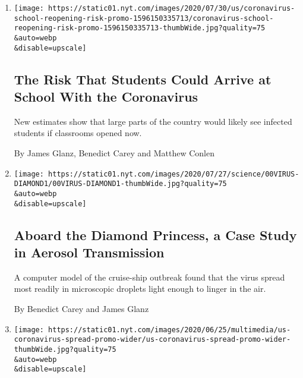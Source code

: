 \begin{enumerate}
\def\labelenumi{\arabic{enumi}.}
\item
  \href{/interactive/2020/07/31/us/coronavirus-school-reopening-risk.html}{}

  \texttt{[image: https://static01.nyt.com/images/2020/07/30/us/coronavirus-school-reopening-risk-promo-1596150335713/coronavirus-school-reopening-risk-promo-1596150335713-thumbWide.jpg?quality=75\\\&auto=webp\\\&disable=upscale]}

  \hypertarget{the-risk-that-students-could-arrive-at-school-with-the-coronavirus}{%
  \subsection{The Risk That Students Could Arrive at School With the
  Coronavirus}\label{the-risk-that-students-could-arrive-at-school-with-the-coronavirus}}

  New estimates show that large parts of the country would likely see
  infected students if classrooms opened now.

  By James Glanz, Benedict Carey and Matthew Conlen
\item
  \href{/2020/07/30/health/diamond-princess-coronavirus-aerosol.html}{}

  \texttt{[image: https://static01.nyt.com/images/2020/07/27/science/00VIRUS-DIAMOND1/00VIRUS-DIAMOND1-thumbWide.jpg?quality=75\\\&auto=webp\\\&disable=upscale]}

  \hypertarget{aboard-the-diamond-princess-a-case-study-in-aerosol-transmission}{%
  \subsection{Aboard the Diamond Princess, a Case Study in Aerosol
  Transmission}\label{aboard-the-diamond-princess-a-case-study-in-aerosol-transmission}}

  A computer model of the cruise-ship outbreak found that the virus
  spread most readily in microscopic droplets light enough to linger in
  the air.

  By Benedict Carey and James Glanz
\item
  \href{/interactive/2020/us/coronavirus-spread.html}{}

  \texttt{[image: https://static01.nyt.com/images/2020/06/25/multimedia/us-coronavirus-spread-promo-wider/us-coronavirus-spread-promo-wider-thumbWide.jpg?quality=75\\\&auto=webp\\\&disable=upscale]}

  \hypertarget{how-the-virus-won}{%
}
\end{enumerate}
